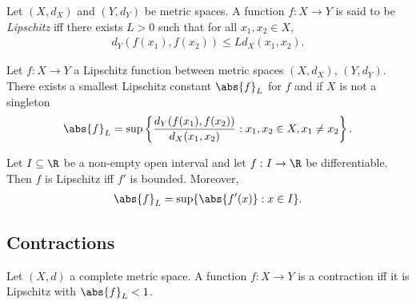 \documentclass{article}
\begin{document}
\begin{definition}
	Let $(X,d_X)$ and $(Y,d_Y)$ be metric spaces. A function $f:X\to Y$ is said to
	be \emph{Lipschitz} iff there exists $L>0$ such that for all $x_1,x_2\in X$,
	\begin{align*}
		d_Y(f(x_1),f(x_2))\leq L d_X(x_1,x_2).
	\end{align*}
\end{definition}

\begin{proposition}[11.4]
	Let $f:X\to Y$ a Lipschitz function between metric spaces $(X,d_X)$, $(Y,d_Y)$.
	There exists a smallest Lipschitz constant $\abs{f}_L$ for $f$ and if $X$ is not a singleton
	\begin{align*}
		\abs{f}_L=\sup\left\lbrace\frac{d_Y(f(x_1),f(x_2))}{d_X(x_1,x_2)}:x_1,x_2\in X, x_1\not=x_2\right\rbrace.
	\end{align*}
\end{proposition}

\begin{proposition}[11.5]
	Let $I\subseteq\R$ be a non-empty open interval and let $f:I\to\R$ be differentiable.
	Then $f$ is Lipschitz iff $f'$ is bounded. Moreover,
	\begin{align*}
		\abs{f}_L = \sup\{\abs{f'(x)}:x\in I\}.
	\end{align*}
\end{proposition}

\subsection{Contractions}

\begin{definition}[Contraction]
	Let $(X,d)$ a complete metric space. A function $f:X\to Y$ is a contraction iff
	it is Lipschitz with $\abs{f}_L<1$.
\end{definition}
\end{document}
